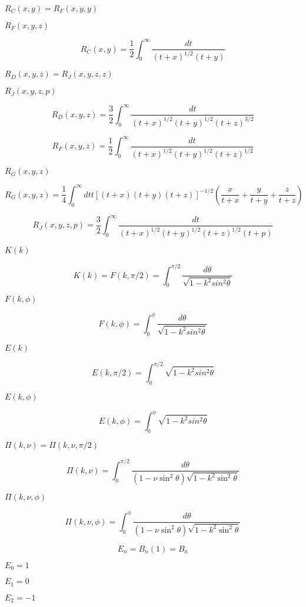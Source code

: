 \documentclass{article}
\begin{document}
$ R_C(x,y) = R_F(x,y,y) $
\pagebreak

$ R_F(x,y,z) $
\pagebreak

\[ R_C(x,y) = \frac{1}{2} \int_0^\infty \frac{dt}{(t + x)^{1/2}(t + y)} \]
\pagebreak

$ R_D(x,y,z) = R_J(x,y,z,z) $
\pagebreak

$ R_J(x,y,z,p) $
\pagebreak

\[ R_D(x,y,z) = \frac{3}{2} \int_0^\infty \frac{dt}{(t + x)^{1/2}(t + y)^{1/2}(t + z)^{3/2}} \]
\pagebreak

\[ R_F(x,y,z) = \frac{1}{2} \int_0^\infty \frac{dt}{(t + x)^{1/2}(t + y)^{1/2}(t + z)^{1/2}} \]
\pagebreak

$ R_G(x,y,z) $
\pagebreak

\[ R_G(x,y,z) = \frac{1}{4} \int_0^\infty dt t [(t + x)(t + y)(t + z)]^{-1/2} (\frac{x}{t + x} + \frac{y}{t + y} + \frac{z}{t + z}) \]
\pagebreak

\[ R_J(x,y,z,p) = \frac{3}{2} \int_0^\infty \frac{dt}{(t + x)^{1/2}(t + y)^{1/2}(t + z)^{1/2}(t + p)} \]
\pagebreak

$ K(k) $
\pagebreak

\[ K(k) = F(k,\pi/2) = \int_0^{\pi/2}\frac{d\theta} {\sqrt{1 - k^2 sin^2\theta}} \]
\pagebreak

$ F(k,\phi) $
\pagebreak

\[ F(k,\phi) = \int_0^{\phi}\frac{d\theta} {\sqrt{1 - k^2 sin^2\theta}} \]
\pagebreak

$ E(k) $
\pagebreak

\[ E(k,\pi/2) = \int_0^{\pi/2}\sqrt{1 - k^2 sin^2\theta} \]
\pagebreak

$ E(k,\phi) $
\pagebreak

\[ E(k,\phi) = \int_0^{\phi} \sqrt{1 - k^2 sin^2\theta} \]
\pagebreak

$ \Pi(k,\nu) = \Pi(k,\nu,\pi/2) $
\pagebreak

\[ \Pi(k,\nu) = \int_0^{\pi/2} \frac{d\theta} {(1 - \nu \sin^2\theta)\sqrt{1 - k^2 \sin^2\theta}} \]
\pagebreak

$ \Pi(k,\nu,\phi) $
\pagebreak

\[ \Pi(k,\nu,\phi) = \int_0^{\phi} \frac{d\theta} {(1 - \nu \sin^2\theta) \sqrt{1 - k^2 \sin^2\theta}} \]
\pagebreak

\[ E_n = B_n(1) = B_n \]
\pagebreak

$ E_0 = 1 $
\pagebreak

$ E_1 = 0 $
\pagebreak

$ E_2 = -1 $
\pagebreak
\end{document}
